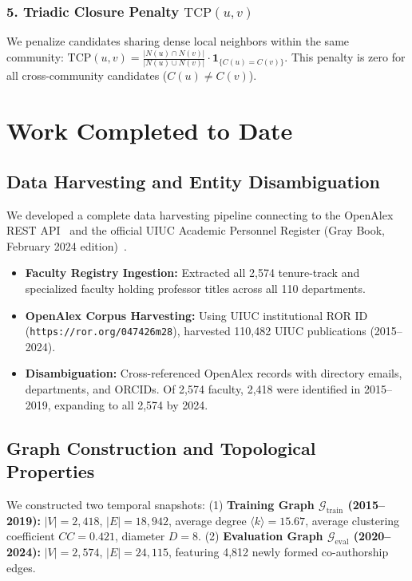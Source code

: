 \subsubsection{5. Triadic Closure Penalty $\text{TCP}(u, v)$}
We penalize candidates sharing dense local neighbors within the same community: $\text{TCP}(u, v) = \frac{|N(u) \cap N(v)|}{|N(u) \cup N(v)|} \cdot \mathbf{1}_{\{C(u) = C(v)\}}$. This penalty is zero for all cross-community candidates ($C(u) \neq C(v)$).

\section{Work Completed to Date}

\subsection{Data Harvesting and Entity Disambiguation}
We developed a complete data harvesting pipeline connecting to the OpenAlex REST API~\cite{openalex} and the official UIUC Academic Personnel Register (Gray Book, February 2024 edition)~\cite{graybook2024}.
\begin{itemize}
    \setlength{\itemsep}{0.2pt}\setlength{\parskip}{0pt}
    \item \textbf{Faculty Registry Ingestion:} Extracted all 2,574 tenure-track and specialized faculty holding professor titles across all 110 departments.
    \item \textbf{OpenAlex Corpus Harvesting:} Using UIUC institutional ROR ID (\texttt{https://ror.org/047426m28}), harvested 110,482 UIUC publications (2015--2024).
    \item \textbf{Disambiguation:} Cross-referenced OpenAlex records with directory emails, departments, and ORCIDs. Of 2,574 faculty, 2,418 were identified in 2015--2019, expanding to all 2,574 by 2024.
\end{itemize}

\subsection{Graph Construction and Topological Properties}
We constructed two temporal snapshots: (1) \textbf{Training Graph $\mathcal{G}_{\text{train}}$ (2015--2019):} $|V| = 2,418$, $|E| = 18,942$, average degree $\langle k \rangle = 15.67$, average clustering coefficient $CC = 0.421$, diameter $D = 8$. (2) \textbf{Evaluation Graph $\mathcal{G}_{\text{eval}}$ (2020--2024):} $|V| = 2,574$, $|E| = 24,115$, featuring 4,812 newly formed co-authorship edges.

